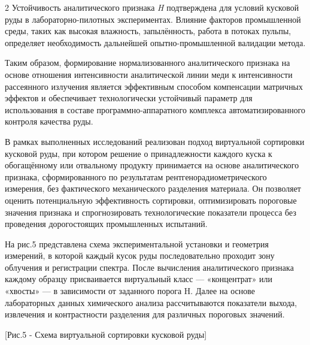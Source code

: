 \begin{multicols}{2}
Устойчивость аналитического признака \emph{H} подтверждена для условий
кусковой руды в лабораторно-пилотных экспериментах. Влияние факторов
промышленной среды, таких как высокая влажность, запылённость, работа в
потоках пульпы, определяет необходимость дальнейшей опытно-промышленной
валидации метода.

Таким образом, формирование нормализованного аналитического признака на
основе отношения интенсивности аналитической линии меди к интенсивности
рассеянного излучения является эффективным способом компенсации
матричных эффектов и обеспечивает технологически устойчивый параметр для
использования в составе программно-аппаратного комплекса
автоматизированного контроля качества руды.

В рамках выполненных исследований реализован подход виртуальной
сортировки кусковой руды, при котором решение о принадлежности каждого
куска к обогащённому или отвальному продукту принимается на основе
аналитического признака, сформированного по результатам
рентгенорадиометрического измерения, без фактического механического
разделения материала. Он позволяет оценить потенциальную эффективность
сортировки, оптимизировать пороговые значения признака и спрогнозировать
технологические показатели процесса без проведения дорогостоящих
промышленных испытаний.

На рис.5 представлена схема экспериментальной установки и геометрия
измерений, в которой каждый кусок руды последовательно проходит зону
облучения и регистрации спектра. После вычисления аналитического
признака каждому образцу присваивается виртуальный класс ---
«концентрат» или «хвосты» --- в зависимости от заданного порога H. Далее
на основе лабораторных данных химического анализа рассчитываются
показатели выхода, извлечения и контрастности разделения для различных
пороговых значений.
\end{multicols}

[Рис.5 - Схема виртуальной сортировки кусковой руды]

